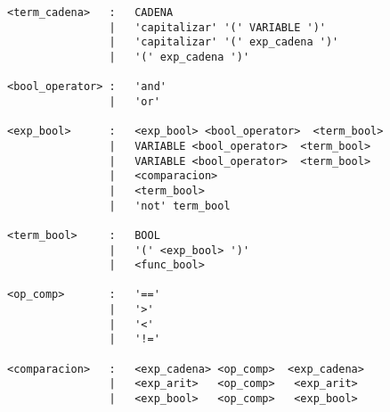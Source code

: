 \begin{verbatim}
<term_cadena>   :   CADENA
                |   'capitalizar' '(' VARIABLE ')'
                |   'capitalizar' '(' exp_cadena ')'
                |   '(' exp_cadena ')'

<bool_operator> :   'and'
                |   'or'

<exp_bool>      :   <exp_bool> <bool_operator>  <term_bool>
                |   VARIABLE <bool_operator>  <term_bool>
                |   VARIABLE <bool_operator>  <term_bool>
                |   <comparacion>
                |   <term_bool>
                |   'not' term_bool

<term_bool>     :   BOOL
                |   '(' <exp_bool> ')'
                |   <func_bool>

<op_comp>       :   '=='
                |   '>'
                |   '<'
                |   '!='

<comparacion>   :   <exp_cadena> <op_comp>  <exp_cadena>
                |   <exp_arit>   <op_comp>   <exp_arit>
                |   <exp_bool>   <op_comp>   <exp_bool>

    
\end{verbatim}
